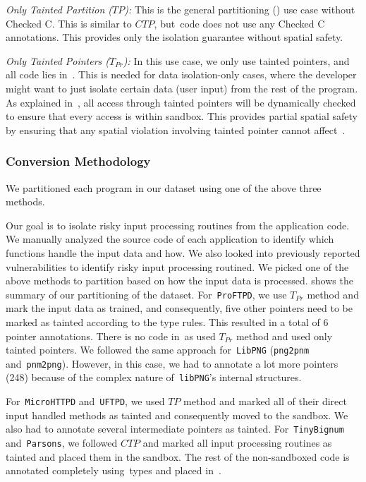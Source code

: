 \noindent\emph{Only Tainted Partition ($TP$):}
This is the general partitioning () use case without Checked C.
This is similar to $CTP$, but~\cregion code does not use any Checked C annotations.
This provides only the isolation guarantee without spatial safety.


\noindent\emph{Only Tainted Pointers ($T_{Pr}$):}
In this use case, we only use tainted pointers, and all code lies in~\cregion.
This is needed for data isolation-only cases, where the developer might want to just isolate certain data (\eg user input) from the rest of the program.
As explained in~, all access through tainted pointers will be dynamically checked to ensure that every access is within sandbox.
This provides partial spatial safety by ensuring that any spatial violation involving tainted pointer cannot affect~\cregion.


\subsubsection{Conversion Methodology}
We partitioned each program in our dataset using one of the above three methods.

Our goal is to isolate risky input processing routines from the application code.
We manually analyzed the source code of each application to identify which functions handle the input data and how.
We also looked into previously reported vulnerabilities to identify risky input processing routined.
We picked one of the above methods to partition based on how the input data is processed.
\tbl{} shows the summary of our partitioning of the dataset.
For~\texttt{ProFTPD}, we use $T_{Pr}$ method and mark the input data as trained, and consequently, five other pointers need to be marked as tainted according to the type rules. This resulted in a total of 6 pointer annotations. There is no code in~\ucregion as used $T_{Pr}$ method and used only tainted pointers.
We followed the same approach for~\texttt{LibPNG} (\texttt{png2pnm} and~\texttt{pnm2png}). However, in this case, we had to annotate a lot more pointers (248) because of the complex nature of~\texttt{libPNG}'s internal structures.

For~\texttt{MicroHTTPD} and~\texttt{UFTPD}, we used $TP$ method and marked all of their direct input handled methods as tainted and consequently moved to the sandbox.
We also had to annotate several intermediate pointers as tainted.
For~\texttt{TinyBignum} and~\texttt{Parsons}, we followed $CTP$ and marked all input processing routines as tainted and placed them in the sandbox.
The rest of the non-sandboxed code is annotated completely using~\checkedc types and placed in~\cregion.

